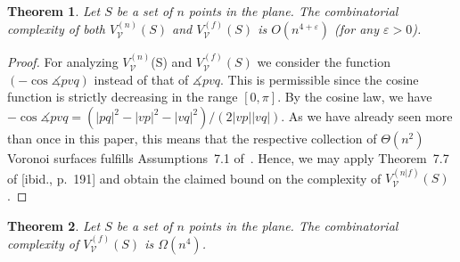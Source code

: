 \documentclass[10pt, conference, compsocconf]{IEEEtran}
\newtheorem{theorem}{Theorem}
\def\V{{\mathcal V}}
\newcommand{\eps}{\varepsilon}
\begin{document}
\begin{theorem}
   Let $S$ be a set of $n$ points in the plane.
   The combinatorial complexity of both $V_\V^{(n)}(S)$ and $V_\V^{(f)}(S)$
   is $O(n^{4+\eps})$ (for any $\eps > 0$).
\end{theorem}

\begin{proof}
   For analyzing $V_\V^{(n)}$(S) and $V_\V^{(f)}(S)$ we consider the function
   $(-\cos \measuredangle{pvq})$ instead of that of $\measuredangle{pvq}$.
   This is permissible since the cosine function is strictly decreasing in
   the range $[0,\pi]$.
   By the cosine law, we have
   $-\cos \measuredangle{pvq} = (|pq|^2-|vp|^2-|vq|^2)/(2|vp||vq|)$.
   As we have already seen more than once in this paper,
   this means that the respective collection of $\Theta(n^2)$ Voronoi
   surfaces fulfills Assumptions~7.1 of~\cite[p.~188]{SA95}.
   Hence, we may apply Theorem~7.7 of [ibid., p.~191] and obtain the
   claimed bound on the complexity of $V_\V^{(n|f)}(S)$.
\end{proof}

\begin{theorem}
   \label{TH-lb-angle-fn}
   Let $S$ be a set of $n$ points in the plane.
   The combinatorial complexity of $V_\V^{(f)}(S)$ is $\Omega(n^4)$.
\end{theorem}
\end{document}

